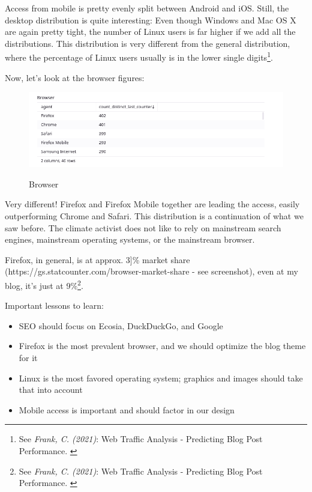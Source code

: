 Access from mobile is pretty evenly split between Android and iOS. Still, the desktop distribution is quite interesting: Even though Windows and Mac OS X are again pretty tight, the number of Linux users is far higher if we add all the distributions. This distribution is very different from the general distribution, where the percentage of Linux users usually is in the lower single digits\footnote{See \textit{Frank, C. (2021)}: Web Traffic Analysis - Predicting Blog Post Performance. \cite{previousBigData}}.

Now, let's look at the browser figures:

\begin{figure}[H]
\centering
\caption {Browser}
\includegraphics[width=\linewidth]{images/figure09.png}
\label{fig:browser}
\end{figure}

Very different! Firefox and Firefox Mobile together are leading the access, easily outperforming Chrome and Safari. This distribution is a continuation of what we saw before. The climate activist does not like to rely on mainstream search engines, mainstream operating systems, or the mainstream browser.

Firefox, in general, is at approx. 3]\% market share (https://gs.statcounter.com/browser-market-share - see screenshot), even at my blog, it's just at 9\%\footnote{See \textit{Frank, C. (2021)}: Web Traffic Analysis - Predicting Blog Post Performance. \cite{previousBigData}}.

Important lessons to learn:

\begin{itemize}
 \item SEO should focus on Ecosia, DuckDuckGo, and Google
 \item Firefox is the most prevalent browser, and we should optimize the blog theme for it
 \item Linux is the most favored operating system; graphics and images should take that into account
 \item Mobile access is important and should factor in our design
\end{itemize}
